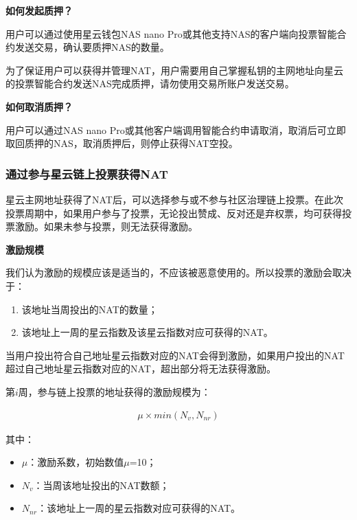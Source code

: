 \vspace{2em}

\textbf{如何发起质押？} 
	
用户可以通过使用星云钱包NAS nano Pro或其他支持NAS的客户端向投票智能合约发送交易，确认要质押NAS的数量。

为了保证用户可以获得并管理NAT，用户需要用自己掌握私钥的主网地址向星云的投票智能合约发送NAS完成质押，请勿使用交易所账户发送交易。

\vspace{2em}

\textbf{如何取消质押？}

用户可以通过NAS nano Pro或其他客户端调用智能合约申请取消，取消后可立即取回质押的NAS，取消质押后，则停止获得NAT空投。

\subsubsection{通过参与星云链上投票获得NAT}

星云主网地址获得了NAT后，可以选择参与或不参与社区治理链上投票。在此次投票周期中，如果用户参与了投票，无论投出赞成、反对还是弃权票，均可获得投票激励。如果未参与投票，则无法获得激励。

\vspace{2em}

\textbf{激励规模}

我们认为激励的规模应该是适当的，不应该被恶意使用的。所以投票的激励会取决于：

\begin{enumerate}
	\item 该地址当周投出的NAT的数量；
	\item 该地址上一周的星云指数及该星云指数对应可获得的NAT。
\end{enumerate}

当用户投出符合自己地址星云指数对应的NAT会得到激励，如果用户投出的NAT超过自己地址星云指数对应的NAT，超出部分将无法获得激励。
	
第$i$周，参与链上投票的地址获得的激励规模为：

\begin{align}
\mu\times min(N_{v}, N_{nr})
\end{align}

其中：

\begin{itemize}
	\item $\mu$：激励系数，初始数值$\mu$=10；
	\item $N_{v}$：当周该地址投出的NAT数额；
	\item $N_{nr}$：该地址上一周的星云指数对应可获得的NAT。
\end{itemize}

